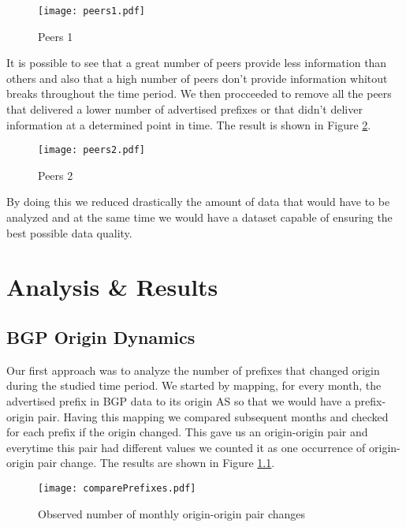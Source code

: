 \documentclass[11pt,a4paper]{scrreprt}
\begin{document}
\begin{figure}[!h]
\centering
\texttt{[image: peers1.pdf]}
\caption{Peers 1}
\label{fig:peers1}
\end{figure}

It is possible to see that a great number of peers provide less information than others and also that a high number of peers don't provide information whitout breaks throughout the time period. We then procceeded to remove all the peers that delivered a lower number of advertised prefixes or that didn't deliver information at a determined point in time. The result is shown in Figure \ref{fig:peers2}.  

\begin{figure}[!h]
\centering
\texttt{[image: peers2.pdf]}
\caption{Peers 2}
\label{fig:peers2}
\end{figure}

By doing this we reduced drastically the amount of data that would have to be analyzed and at the same time we would have a dataset capable of ensuring the best possible data quality. 

\chapter{Analysis \& Results}


\section{BGP Origin Dynamics}

Our first approach was to analyze the number of prefixes that changed origin during the studied time period. We started by mapping, for every month, the advertised prefix in BGP data to its origin AS so that we would have a prefix-origin pair. Having this mapping we compared subsequent months and checked for each prefix if the origin changed. This gave us an origin-origin pair and everytime this pair had different values we counted it as one occurrence of origin-origin pair change. The results are shown in Figure \ref{fig:comparePrefixes}.

\begin{figure}[!h]
\centering
\texttt{[image: comparePrefixes.pdf]}
\caption{Observed number of monthly
origin-origin pair changes}
\label{fig:comparePrefixes}
\end{figure}
\end{document}
